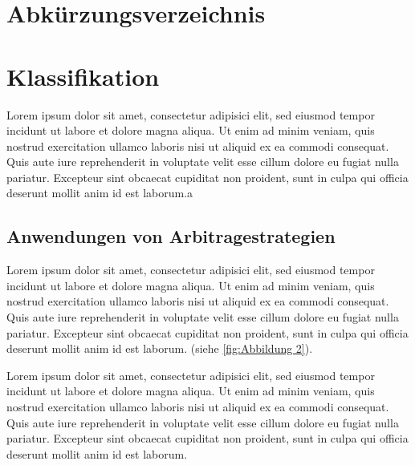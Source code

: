 \documentclass[12pt, a4paper, oneside]{article}
\newcounter{SeitenzahlSpeicher}
\begin{document}
\section*{Abkürzungsverzeichnis} 
\newpage
\clearpage
\setcounter{SeitenzahlSpeicher}{\value{page}}
\newpage
{}




\section{Klassifikation}
Lorem ipsum dolor sit amet, consectetur adipisici elit, sed eiusmod tempor incidunt ut labore et dolore magna aliqua. Ut enim ad minim veniam, quis nostrud exercitation ullamco laboris nisi ut aliquid ex ea commodi consequat. Quis aute iure reprehenderit in voluptate velit esse cillum dolore eu fugiat nulla pariatur. Excepteur sint obcaecat cupiditat non proident, sunt in culpa qui officia deserunt mollit anim id est laborum.a
\subsection{Anwendungen von Arbitragestrategien}
Lorem ipsum dolor sit amet, consectetur adipisici elit, sed eiusmod tempor incidunt ut labore et dolore magna aliqua. Ut enim ad minim veniam, quis nostrud exercitation ullamco laboris nisi ut aliquid ex ea commodi consequat. Quis aute iure reprehenderit in voluptate velit esse cillum dolore eu fugiat nulla pariatur. Excepteur sint obcaecat cupiditat non proident, sunt in culpa qui officia deserunt mollit anim id est laborum. (siehe \autoref{fig:Abbildung 2}).
%

%
Lorem ipsum dolor sit amet, consectetur adipisici elit, sed eiusmod tempor incidunt ut labore et dolore magna aliqua. Ut enim ad minim veniam, quis nostrud exercitation ullamco laboris nisi ut aliquid ex ea commodi consequat. Quis aute iure reprehenderit in voluptate velit esse cillum dolore eu fugiat nulla pariatur. Excepteur sint obcaecat cupiditat non proident, sunt in culpa qui officia deserunt mollit anim id est laborum.
\end{document}
